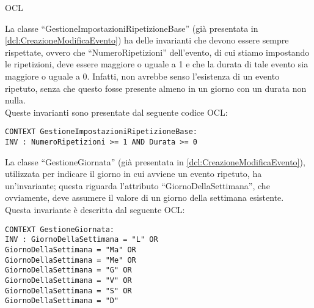 \begin{listaPersonale}{OCL}
    \begin{center}
        
    \end{center}
    La classe “GestioneImpostazioniRipetizioneBase” (già presentata in
    \ref{dcl:CreazioneModificaEvento}) ha delle invarianti che devono essere sempre rispettate, ovvero che “NumeroRipetizioni” dell’evento, di cui stiamo impostando le ripetizioni, deve essere maggiore o uguale a 1 e che la durata di tale evento sia maggiore o uguale a 0. Infatti, non avrebbe senso l'esistenza di un evento ripetuto, senza che questo fosse presente almeno in un giorno con un durata non nulla.\\
    Queste invarianti sono presentate dal seguente codice OCL:

    \begin{lstlisting}
CONTEXT GestioneImpostazioniRipetizioneBase:
INV : NumeroRipetizioni >= 1 AND Durata >= 0
    \end{lstlisting}




    \begin{center}
        
    \end{center}
    La classe “GestioneGiornata” (già presentata in \ref{dcl:CreazioneModificaEvento}), utilizzata per indicare il giorno in cui avviene un evento ripetuto, ha un’invariante; questa riguarda l’attributo “GiornoDellaSettimana”, che ovviamente, deve assumere il valore di un giorno della settimana esistente.\\
    Questa invariante è descritta dal seguente OCL:

    \begin{lstlisting}
CONTEXT GestioneGiornata:
INV : GiornoDellaSettimana = "L" OR
GiornoDellaSettimana = "Ma" OR
GiornoDellaSettimana = "Me" OR
GiornoDellaSettimana = "G" OR
GiornoDellaSettimana = "V" OR
GiornoDellaSettimana = "S" OR
GiornoDellaSettimana = "D"
    \end{lstlisting}





\end{listaPersonale}
